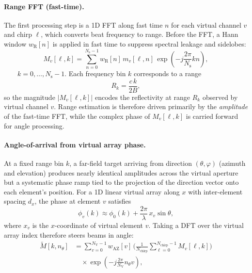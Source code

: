 \paragraph{Range FFT (fast-time).}
The first processing step is a 1D FFT along fast time $n$ for each virtual channel $v$ and chirp $\ell$, which converts beat frequency to range. Before the FFT, a Hann window $w_\text{R}[n]$ is applied in fast time to suppress spectral leakage and sidelobes:
\begin{equation}
    M_v[\ell,k]
    =
    \sum_{n=0}^{N_\text{s}-1}
        w_\text{R}[n]\,
        m_v[\ell,n]\,
        \exp\!\left(
            -j \frac{2\pi}{N_\text{s}} k n
        \right),
    \label{eq:range_fft}
\end{equation}
$\qquad k = 0,\dots,N_\text{s}-1.$ Each frequency bin $k$ corresponds to a range
\begin{equation}
    R_k = \frac{c\,k}{2B},
    \label{eq:range_bin}
\end{equation}
so the magnitude $\lvert M_v[\ell,k]\rvert$ encodes the reflectivity at range $R_k$ observed by virtual channel $v$. Range estimation is therefore driven primarily by the \emph{amplitude} of the fast-time FFT, while the complex phase of $M_v[\ell,k]$ is carried forward for angle processing.

\paragraph{Angle-of-arrival from virtual array phase.}
At a fixed range bin $k$, a far-field target arriving from direction $(\theta,\varphi)$ (azimuth and elevation) produces nearly identical amplitudes across the virtual aperture but a systematic phase ramp tied to the projection of the direction vector onto each element’s position. For a 1D linear virtual array along $x$ with inter-element spacing $d_x$, the phase at element $v$ satisfies
\begin{equation}
    \phi_v(k) \approx \phi_0(k) 
    + \frac{2\pi}{\lambda}\, x_v \sin\theta,
\end{equation}
where $x_v$ is the $x$-coordinate of virtual element $v$. Taking a DFT over the virtual array index therefore steers beams in angle:
\begin{align}
\widetilde{M}[k,n_\theta]
&=
\sum_{v=0}^{N_\mathrm{V}-1}
    w_\mathrm{AZ}[v]\,
    \Big(
        \frac{1}{N_\text{chirp}}
        \sum_{\ell=0}^{N_\text{chirp}-1}
            M_v[\ell,k]
    \Big)
    \nonumber\\
&\quad\times
    \exp\!\left(
        -j \frac{2\pi}{N_\mathrm{V}} n_\theta v
    \right),
\label{eq:azimuth_fft}
\end{align}

